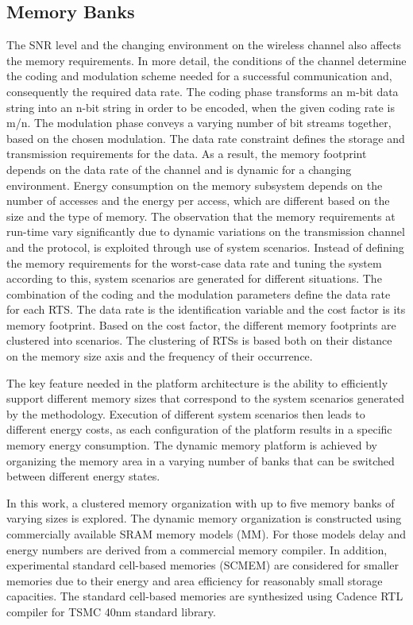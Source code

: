 \subsection{Memory Banks}

The SNR level and the changing environment on the wireless channel also affects the memory requirements. In more detail, the conditions of the channel determine the coding and modulation scheme needed for a successful communication and, consequently the required data rate. The coding phase transforms an m-bit data string into an n-bit string in order to be encoded, when the given coding rate is m/n. The modulation phase conveys a varying number of bit streams together, based on the chosen modulation. The data rate constraint defines the storage and transmission requirements for the data. As a result, the memory footprint depends on the data rate of the channel and is dynamic for a changing environment. Energy consumption on the memory subsystem depends on the number of accesses and the energy per access, which are different based on the size and the type of memory.
The observation that the memory requirements at run-time vary significantly due to dynamic variations on the transmission channel and the protocol, is exploited through use of system scenarios. Instead of defining the memory requirements for the worst-case data rate and tuning the system according to this, system scenarios are generated for different situations. The combination of the coding and the modulation parameters define the data rate for each RTS. The data rate is the identification variable and the cost factor is its memory footprint. Based on the cost factor, the different memory footprints are clustered into scenarios. The clustering of RTSs is based both on their distance on the memory size axis and the frequency of their occurrence.

The key feature needed in the platform architecture is the ability to efficiently support different memory sizes that correspond to the system scenarios generated by the methodology. Execution of different system scenarios then leads to different energy costs, as each configuration of the platform results in a specific memory energy consumption. The dynamic memory platform is achieved by organizing the memory area in a varying number of banks that can be switched between different energy states.  

In this work, a clustered memory organization with up to five memory banks of varying sizes is explored. The dynamic memory organization is constructed using commercially available SRAM memory models (MM). For those models delay and energy numbers are derived from a commercial memory compiler. In addition, experimental standard cell-based memories (SCMEM) \cite{19} are considered for smaller memories due to their energy and area efficiency for reasonably small storage capacities. The standard cell-based memories are synthesized using Cadence RTL compiler for TSMC 40nm standard library.

